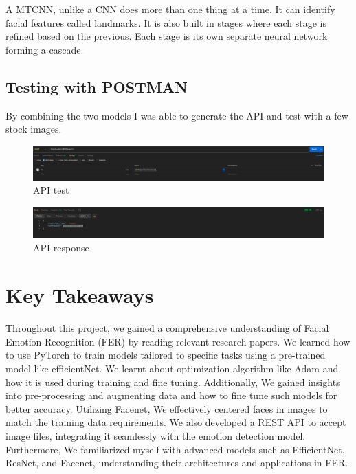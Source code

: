 \documentclass{article}
\begin{document}
A MTCNN, unlike a CNN  does more than one thing at a time. It can identify facial features called landmarks. It is also built in stages where each stage is refined based on the previous. Each stage is its own separate neural network forming a cascade.

\subsection*{Testing with POSTMAN}
By combining the two models I was able to generate the API and test with a few stock images.
\begin{figure}[H]
    \centering
    \includegraphics[width=\textwidth]{request.png}
    \caption{API test}
    \label{fig:postman_test}
\end{figure}
\begin{figure}[H]
    \centering
    \includegraphics[width=\textwidth]{response.png}
    \caption{API response}
    \label{fig:postman_test2}
\end{figure}

\section*{Key Takeaways}

Throughout this project, we gained a comprehensive understanding of Facial Emotion Recognition (FER) by reading relevant research papers.
We learned how to use PyTorch to train models tailored to specific tasks using a pre-trained model like efficientNet.
We learnt about optimization algorithm like Adam and how it is used during training and fine tuning.
Additionally, We gained insights into pre-processing and augmenting data and how  to fine tune such models for better accuracy.
Utilizing Facenet, We effectively centered faces in images to match the training data requirements.
We also developed a REST API to accept image files, integrating it seamlessly with the emotion detection model. 
Furthermore, We familiarized myself with advanced models such as EfficientNet, ResNet, and Facenet, understanding their architectures and applications in FER.
\end{document}
